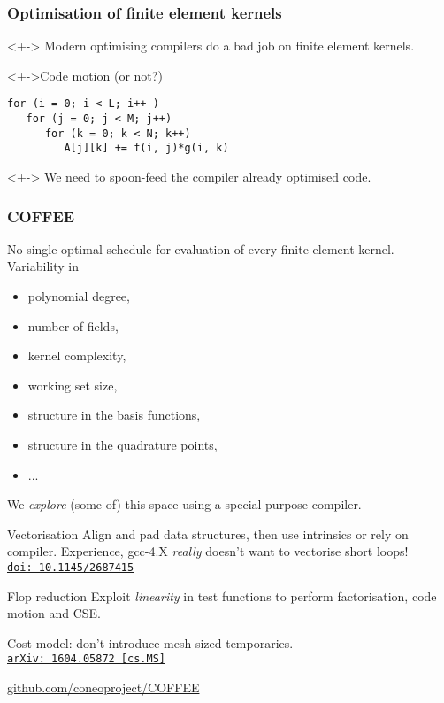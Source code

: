 \documentclass[presentation]{beamer}
\newcommand{\arxivlink}[2]{%
  \href{http://www.arxiv.org/abs/#1}%
  {{\small\texttt{arXiv:\,#1\,[#2]}}}%
}
\newcommand{\doilink}[1]{%
  \href{http://dx.doi.org/#1}%
  {{\small\texttt{doi:\,#1}{}}}%
}
\begin{document}
\begin{frame}[fragile]
  \frametitle{Optimisation of finite element kernels}
  
  \begin{problem}<+->
    Modern optimising compilers do a bad job on finite element
    kernels.
  \end{problem}
  \begin{exampleblock}<+->{Code motion (or not?)}
\begin{verbatim}
for (i = 0; i < L; i++ )
   for (j = 0; j < M; j++)
      for (k = 0; k < N; k++)
         A[j][k] += f(i, j)*g(i, k)
\end{verbatim}
  \end{exampleblock}
  \begin{corollary}<+->
    We need to spoon-feed the compiler already optimised code.
  \end{corollary}
\end{frame}
\begin{frame}[allowframebreaks]
  \frametitle{COFFEE}

  No single optimal schedule for evaluation of every finite element
  kernel.  Variability in
  \begin{itemize}
  \item polynomial degree,
  \item number of fields,
  \item kernel complexity,
  \item working set size,
  \item structure in the basis functions,
  \item structure in the quadrature points,
  \item ...
  \end{itemize}
  We \emph{explore} (some of) this space using a special-purpose
  compiler.

\pagebreak

\begin{block}{Vectorisation}
  Align and pad data structures, then use intrinsics or rely on
  compiler.  Experience, gcc-4.X \emph{really} doesn't want to
  vectorise short loops!\\
  \cite{Luporini:2015} \doilink{10.1145/2687415}
\end{block}

\begin{block}{Flop reduction}
  Exploit \emph{linearity} in test functions to perform factorisation,
  code motion and CSE.  

Cost model: don't introduce mesh-sized
  temporaries.\\
  \cite{Luporini:2016} \arxivlink{1604.05872}{cs.MS}
\end{block}

\begin{center}
  \url{github.com/coneoproject/COFFEE}
\end{center}
\end{frame}
\end{document}
